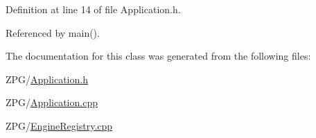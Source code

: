 Definition at line 14 of file Application.\+h.



Referenced by main().



The documentation for this class was generated from the following files\+:\begin{DoxyCompactItemize}
\item 
Z\+P\+G/\mbox{\hyperlink{Application_8h}{Application.\+h}}\item 
Z\+P\+G/\mbox{\hyperlink{Application_8cpp}{Application.\+cpp}}\item 
Z\+P\+G/\mbox{\hyperlink{EngineRegistry_8cpp}{Engine\+Registry.\+cpp}}\end{DoxyCompactItemize}
